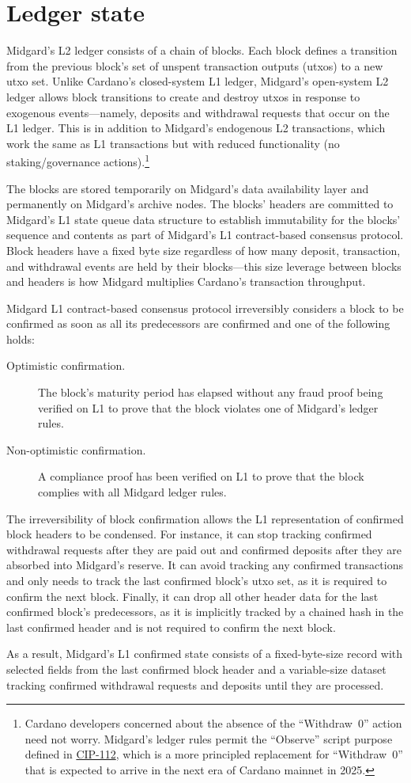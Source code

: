 \documentclass[../midgard.tex]{subfiles}
\begin{document}
\chapter{Ledger state}
\label{h:ledger-state}

Midgard's L2 ledger consists of a chain of blocks.
Each block defines a transition from the previous block's set of unspent transaction outputs (utxos) to a new utxo set.
Unlike Cardano's closed-system L1 ledger, Midgard's open-system L2 ledger allows block transitions to create and destroy utxos in response to exogenous events---namely, deposits and withdrawal requests that occur on the L1 ledger.
This is in addition to Midgard's endogenous L2 transactions, which work the same as L1 transactions but with reduced functionality (no staking/governance actions).\footnote{Cardano developers concerned about the absence of the ``Withdraw~0'' action need not worry.
Midgard's ledger rules permit the ``Observe'' script purpose defined in \href{https://github.com/cardano-foundation/CIPs/tree/master/CIP-0112}{CIP-112}, which is a more principled replacement for ``Withdraw~0'' that is expected to arrive in the next era of Cardano mainnet in 2025.}

The blocks are stored temporarily on Midgard's data availability layer and permanently on Midgard's archive nodes.
The blocks' headers are committed to Midgard's L1 state queue data structure to establish immutability for the blocks' sequence and contents as part of Midgard's L1 contract-based consensus protocol.
Block headers have a fixed byte size regardless of how many deposit, transaction, and withdrawal events are held by their blocks---this size leverage between blocks and headers is how Midgard multiplies Cardano's transaction throughput.

Midgard L1 contract-based consensus protocol irreversibly considers a block to be confirmed as soon as all its predecessors are confirmed and one of the following holds:
\begin{description}
    \item[Optimistic confirmation.] The block's maturity period has elapsed without any fraud proof being verified on L1 to prove that the block violates one of Midgard's ledger rules.
    \item[Non-optimistic confirmation.] A compliance proof has been verified on L1 to prove that the block complies with all Midgard ledger rules.
\end{description}

The irreversibility of block confirmation allows the L1 representation of confirmed block headers to be condensed.
For instance, it can stop tracking confirmed withdrawal requests after they are paid out and confirmed deposits after they are absorbed into Midgard's reserve.
It can avoid tracking any confirmed transactions and only needs to track the last confirmed block's utxo set, as it is required to confirm the next block.
Finally, it can drop all other header data for the last confirmed block's predecessors, as it is implicitly tracked by a chained hash in the last confirmed header and is not required to confirm the next block.

As a result, Midgard's L1 confirmed state consists of a fixed-byte-size record with selected fields from the last confirmed block header and a variable-size dataset tracking confirmed withdrawal requests and deposits until they are processed.
\end{document}
